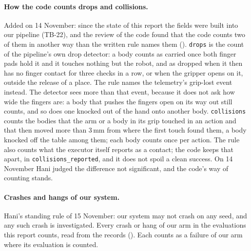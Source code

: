 \paragraph{How the code counts drops and collisions.} Added on 14 November: since the
state of this report the fields were built into our pipeline (TB-22), and the review
of the code found that the code counts two of them in another way than the written
rule names them (). \texttt{drops} is the count of the
pipeline's own drop detector: a body counts as carried once both finger pads hold it
and it touches nothing but the robot, and as dropped when it then has no finger
contact for three checks in a row, or when the gripper opens on it, outside the
release of a place. The rule names the telemetry's grip-lost event instead. The
detector sees more than that event, because it does not ask how wide the fingers
are: a body that pushes the fingers open on its way out still counts, and so does one
knocked out of the hand onto another body. \texttt{collisions} counts the bodies that
the arm or a body in its grip touched in an action and that then moved more than
3\,mm from where the first touch found them, a body knocked off the table among them;
each body counts once per action. The rule also counts what the executor itself
reports as a contact; the code keeps that apart, in \texttt{collisions\_reported}, and
it does not spoil a clean success. On 14 November Hani judged the difference not
significant, and the code's way of counting stands.

\paragraph{Crashes and hangs of our system.} Hani's standing rule of 15 November: our
system may not crash on any seed, and any such crash is investigated. Every crash or
hang of our arm in the evaluations this report counts, read from the records
(). Each counts as a failure of our arm where its evaluation is
counted.

